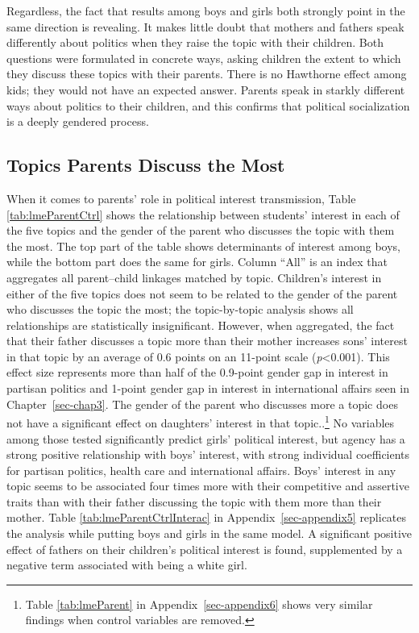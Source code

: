 \documentclass[
  letterpaper,
  DIV=11,
  numbers=noendperiod]{scrreprt}
\begin{document}
Regardless, the fact that results among boys and girls both strongly
point in the same direction is revealing. It makes little doubt that
mothers and fathers speak differently about politics when they raise the
topic with their children. Both questions were formulated in concrete
ways, asking children the extent to which they discuss these topics with
their parents. There is no Hawthorne effect among kids; they would not
have an expected answer. Parents speak in starkly different ways about
politics to their children, and this confirms that political
socialization is a deeply gendered process.

\subsection{Topics Parents Discuss the
Most}\label{topics-parents-discuss-the-most}

When it comes to parents' role in political interest transmission, Table
\ref{tab:lmeParentCtrl} shows the relationship between students'
interest in each of the five topics and the gender of the parent who
discusses the topic with them the most. The top part of the table shows
determinants of interest among boys, while the bottom part does the same
for girls. Column ``All'' is an index that aggregates all parent--child
linkages matched by topic. Children's interest in either of the five
topics does not seem to be related to the gender of the parent who
discusses the topic the most; the topic-by-topic analysis shows all
relationships are statistically insignificant. However, when aggregated,
the fact that their father discusses a topic more than their mother
increases sons' interest in that topic by an average of 0.6 points on an
11-point scale (\emph{p}\textless0.001). This effect size represents
more than half of the 0.9-point gender gap in interest in partisan
politics and 1-point gender gap in interest in international affairs
seen in Chapter~\ref{sec-chap3}. The gender of the parent who discusses
more a topic does not have a significant effect on daughters' interest
in that topic..\footnote{Table \ref{tab:lmeParent} in
  Appendix~\ref{sec-appendix6} shows very similar findings when control
  variables are removed.} No variables among those tested significantly
predict girls' political interest, but agency has a strong positive
relationship with boys' interest, with strong individual coefficients
for partisan politics, health care and international affairs. Boys'
interest in any topic seems to be associated four times more with their
competitive and assertive traits than with their father discussing the
topic with them more than their mother. Table
\ref{tab:lmeParentCtrlInterac} in Appendix~\ref{sec-appendix5}
replicates the analysis while putting boys and girls in the same model.
A significant positive effect of fathers on their children's political
interest is found, supplemented by a negative term associated with being
a white girl.
\end{document}
